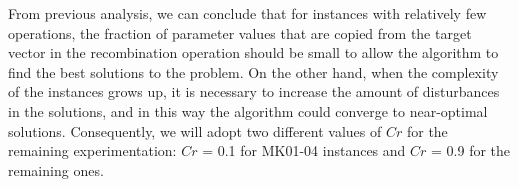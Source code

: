 From previous analysis, we can conclude that for instances with relatively few operations, the fraction of parameter values that are copied from the target vector in the recombination operation should be small to allow the algorithm to find the best solutions to the problem. On the other hand, when the complexity of the instances grows up, it is necessary to increase the amount of disturbances in the solutions, and in this way the algorithm could converge to near-optimal solutions. Consequently, we will adopt two different values of $Cr$ for the remaining experimentation: $Cr$ = 0.1 for MK01-04 instances and $Cr$ = 0.9 for the remaining ones. 


